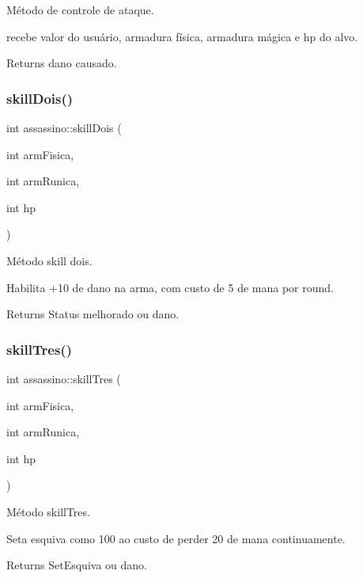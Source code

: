 Método de controle de ataque. 

recebe valor do usuário, armadura física, armadura mágica e hp do alvo. \begin{DoxyReturn}{Returns}
dano causado. 
\end{DoxyReturn}
\mbox{\label{classassassino_acd757ef4b59c18d2aa504a6afa15b107}} 
\subsubsection{\texorpdfstring{skill\+Dois()}{skillDois()}}
{\footnotesize\ttfamily int assassino\+::skill\+Dois (\begin{DoxyParamCaption}\item[{int}]{arm\+Fisica,  }\item[{int}]{arm\+Runica,  }\item[{int}]{hp }\end{DoxyParamCaption})}



Método skill dois. 

Habilita +10 de dano na arma, com custo de 5 de mana por round. \begin{DoxyReturn}{Returns}
Status melhorado ou dano. 
\end{DoxyReturn}
\mbox{\label{classassassino_ad13d3c24ad8f2f3e0c7274a1a18a0d39}} 
\subsubsection{\texorpdfstring{skill\+Tres()}{skillTres()}}
{\footnotesize\ttfamily int assassino\+::skill\+Tres (\begin{DoxyParamCaption}\item[{int}]{arm\+Fisica,  }\item[{int}]{arm\+Runica,  }\item[{int}]{hp }\end{DoxyParamCaption})}



Método skill\+Tres. 

Seta esquiva como 100 ao custo de perder 20 de mana continuamente. \begin{DoxyReturn}{Returns}
Set\+Esquiva ou dano. 
\end{DoxyReturn}
\mbox{\label{classassassino_a02ee2eea7a7f1ca7ca8d1b88e481ab97}} 
